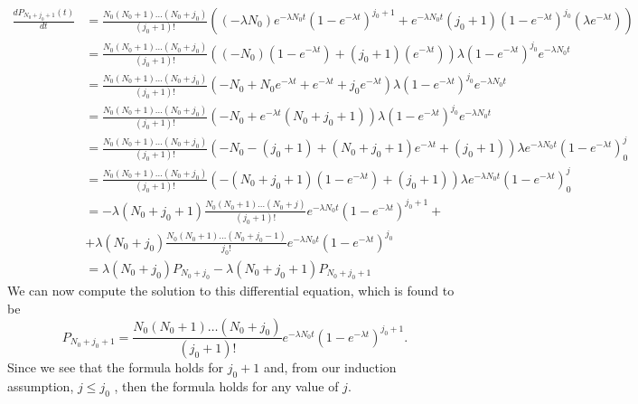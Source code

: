 \begin{align*}
\frac{dP_{N_0+j_{0}+1}(t)}{dt}&=\frac{N_0(N_0+1)\dots(N_0+j_{0})}{(j_{0}+1)!}\left((-\lambda N_0)e^{-\lambda N_0 t}(1-e^{-\lambda t})^{j_{0}+1}+e^{-\lambda N_0 t}(j_{0}+1)(1-e^{-\lambda t})^{j_{0}}(\lambda e^{-\lambda t})\right)\\
&=\frac{N_0(N_0+1)\dots(N_0+j_{0})}{(j_{0}+1)!}\left((- N_0)(1-e^{-\lambda t})+(j_{0}+1)(e^{-\lambda t})\right)\lambda(1-e^{-\lambda t})^{j_{0}}e^{-\lambda N_0 t}\\
&=\frac{N_0(N_0+1)\dots(N_0+j_{0})}{(j_{0}+1)!}\left(- N_0+N_0e^{-\lambda t}+e^{-\lambda t}+j_{0}e^{-\lambda t}\right)\lambda(1-e^{-\lambda t})^{j_{0}}e^{-\lambda N_0 t}\\
&=\frac{N_0(N_0+1)\dots(N_0+j_{0})}{(j_{0}+1)!}\left(- N_0+e^{-\lambda t}(N_0+j_{0}+1)\right)\lambda(1-e^{-\lambda t})^{j_{0}}e^{-\lambda N_0 t}\\
&= \frac{N_0(N_0+1)\dots(N_0+j_{0})}{(j_{0}+1)!}\left(-N_0-(j_{0}+1) +(N_0+j_{0}+1)e^{-\lambda t}+(j_{0}+1) \right)\lambda e^{-\lambda N_0 t}(1-e^{-\lambda t})^j_{0}\\
&= \frac{N_0(N_0+1)\dots(N_0+j_{0})}{(j_{0}+1)!}\left(-(N_0+j_{0}+1) (1-e^{-\lambda t})+(j_{0}+1) \right)\lambda e^{-\lambda N_0 t}(1-e^{-\lambda t})^j_{0}\\
&= - \lambda (N_0+j_{0}+1) \frac{N_0(N_0+1)\dots(N_0+j)}{(j_{0}+1)!}e^{-\lambda N_0 t}(1-e^{-\lambda t})^{j_{0}+1}+\\
&+\lambda (N_0+j_{0}) \frac{N_0(N_0+1)\dots(N_0+j_{0}-1)}{j_{0}!}e^{-\lambda N_0 t}(1-e^{-\lambda t})^{j_{0}}\\
&=\lambda (N_0+j_{0}) P_{N_0+j_{0}} - \lambda (N_0+j_{0}+1) P_{N_0+j_{0}+1}
\end{align*}
We can now compute the solution to this differential equation, which is found to be
$$
P_{N_{0}+j_{0}+1}=\frac{N_{0}(N_{0}+1)\dots(N_{0}+j_{0})}{(j_{0}+1)!}e^{-\lambda N_{0}t}(1-e^{-\lambda t})^{j_{0}+1}.
$$
Since we see that the formula holds for $j_{0}+1$ and, from our induction assumption, $j \leq j_{0}$ , then the formula holds for any value of $j$.
			